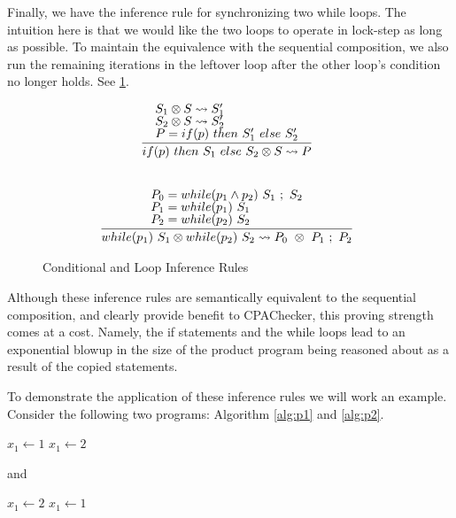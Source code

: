 \documentclass[letterpaper,twocolumn,10pt]{article}
\newcommand{\cross}{\otimes{}}
\begin{document}
Finally, we have the inference rule for synchronizing two while loops. The intuition here is that we would like the two loops to operate in lock-step as long as possible. To maintain the equivalence with the sequential composition, we also run the remaining iterations in the leftover loop after the other loop's condition no longer holds. See \ref{fig:infrules2}.

\begin{figure}
    \caption{Conditional and Loop Inference Rules}
    \label{fig:infrules2}
    \[
		\begin{array}{c}
			\infer[]{if(p)\ then\ S_1\ else\ S_2 \cross S \leadsto P}{
				\text{$S_1 \cross S \leadsto S_1'$} \\
				\text{$S_2 \cross S \leadsto S_2'$} \\
				\text{$P = if(p)\ then\ S_1'\ else\ S_2'$}
			} \\ \\ \\
			\infer[]{while(p_1)\ S_1 \cross while(p_2)\ S_2 \leadsto P_0\ \cross\ P_1\ ;\ P_2}{
				\text{$P_0 = while(p_1 \land p_2)\ S_1\ ;\ S_2$} \\
				\text{$P_1 = while(p_1)\ S_1$} \\
				\text{$P_2 = while(p_2)\ S_2$}
			}
        \end{array}
    \]
\end{figure}

Although these inference rules are semantically equivalent to the sequential composition, and clearly provide benefit to CPAChecker, this proving strength comes at a cost. Namely, the if statements and the while loops lead to an exponential blowup in the size of the product program being reasoned about as a result of the copied statements. 

To demonstrate the application of these inference rules we will work an example. Consider the following two programs: Algorithm \ref{alg:p1} and \ref{alg:p2}.

\begin{algorithm}
  \caption{$P1$}
  \label{alg:p1}
  \begin{algorithmic}[1]
        \State $x_1 \gets 1$
    \Else
        \State $x_1 \gets 2$
    \EndIf
  \end{algorithmic}
\end{algorithm}

and

\begin{algorithm}
  \caption{$P1$}
  \label{alg:p2}
  \begin{algorithmic}[1]
        \State $x_1 \gets 2$
    \Else
        \State $x_1 \gets 1$
    \EndIf
  \end{algorithmic}
\end{algorithm}
\end{document}

